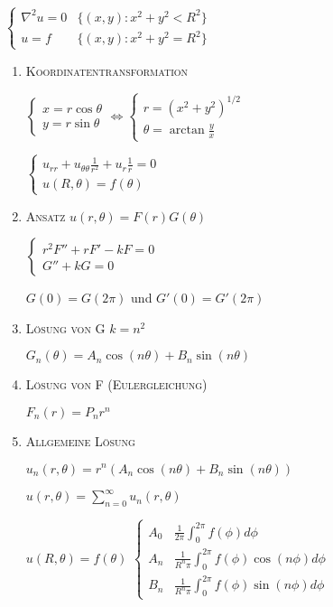 \documentclass[10pt,a4paper]{scrartcl}
\begin{document}
\begin{multicols*}{3}
	\begin{center}
	$\begin{cases}
	\nabla^2u=0&	\{(x,y):x^2+y^2<R^2\}\\
	u = f&	\{(x,y):x^2+y^2=R^2\}
	\end{cases}$
	\end{center}
	
	\begin{enumerate}
	\item \scshape{Koordinatentransformation}
	
	$
	\begin{cases}
	x = r\cos \theta\\
	y = r\sin \theta	
	\end{cases}	
	\Leftrightarrow
	\begin{cases}
	r = (x^2+y^2)^{1/2}\\
	\theta = \arctan \frac{y}{x}
	\end{cases}
	$
	
	$
	\begin{cases}
	u_{rr}+u_{\theta\theta}\frac{1}{r^2}+u_r\frac{1}{r} = 0 \\
	u(R,\theta)=f(\theta)
	\end{cases}
	$
	
	\item \scshape{Ansatz} $u(r,\theta)=F(r)G(\theta)$
	
	$
	\begin{cases}
	r^2F''+rF'-kF=0\\
	G''+kG=0
	\end{cases}
	$
	
	$G(0)=G(2\pi)$ und $G'(0)=G'(2\pi)$
	
	\item \scshape{Lösung von G} $k = n^2$
	
	$G_n(\theta)=A_n \cos(n\theta)+B_n\sin(n\theta)$
	
	\item \scshape{Lösung von F} (Eulergleichung)
	
	$F_n(r)=P_nr^n$
	
	\item \scshape{Allgemeine Lösung}
	
	$u_n(r,\theta)=r^n(A_n\cos(n\theta)+B_n\sin(n\theta))$
	
	$u(r,\theta)=\sum_{n=0}^\infty{u_n(r,\theta)}$
	
	$u(R,\theta)=f(\theta)$\dahe
	$
	\begin{cases}
	A_0&	\frac{1}{2\pi}\int_0^{2\pi}{f(\phi)d\phi}\\
	A_n&	\frac{1}{R^n\pi}\int_0^{2\pi}{f(\phi)\cos(n\phi)d\phi}\\
	B_n&	\frac{1}{R^n\pi}\int_0^{2\pi}{f(\phi)\sin(n\phi)d\phi}
	\end{cases}
	$
	

\end{enumerate}
\end{multicols*}
\end{document}
